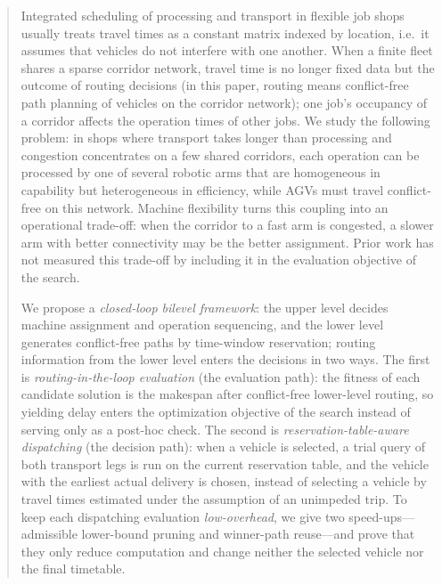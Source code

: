 \begin{abstract}
Integrated scheduling of processing and transport in flexible job shops usually treats travel times as a constant matrix indexed by location, i.e.\ it assumes that vehicles do not interfere with one another.
When a finite fleet shares a sparse corridor network, travel time is no longer fixed data but the outcome of routing decisions (in this paper, routing means conflict-free path planning of vehicles on the corridor network); one job's occupancy of a corridor affects the operation times of other jobs.
We study the following problem: in shops where transport takes longer than processing and congestion concentrates on a few shared corridors, each operation can be processed by one of several robotic arms that are homogeneous in capability but heterogeneous in efficiency, while AGVs must travel conflict-free on this network.
Machine flexibility turns this coupling into an operational trade-off: when the corridor to a fast arm is congested, a slower arm with better connectivity may be the better assignment. Prior work has not measured this trade-off by including it in the evaluation objective of the search.

We propose a \emph{closed-loop bilevel framework}: the upper level decides machine assignment and operation sequencing, and the lower level generates conflict-free paths by time-window reservation; routing information from the lower level enters the decisions in two ways.
The first is \emph{routing-in-the-loop evaluation} (the evaluation path): the fitness of each candidate solution is the makespan after conflict-free lower-level routing, so yielding delay enters the optimization objective of the search instead of serving only as a post-hoc check.
The second is \emph{reservation-table-aware dispatching} (the decision path): when a vehicle is selected, a trial query of both transport legs is run on the current reservation table, and the vehicle with the earliest actual delivery is chosen, instead of selecting a vehicle by travel times estimated under the assumption of an unimpeded trip.
To keep each dispatching evaluation \emph{low-overhead}, we give two speed-ups---admissible lower-bound pruning and winner-path reuse---and prove that they only reduce computation and change neither the selected vehicle nor the final timetable.


\end{abstract}
